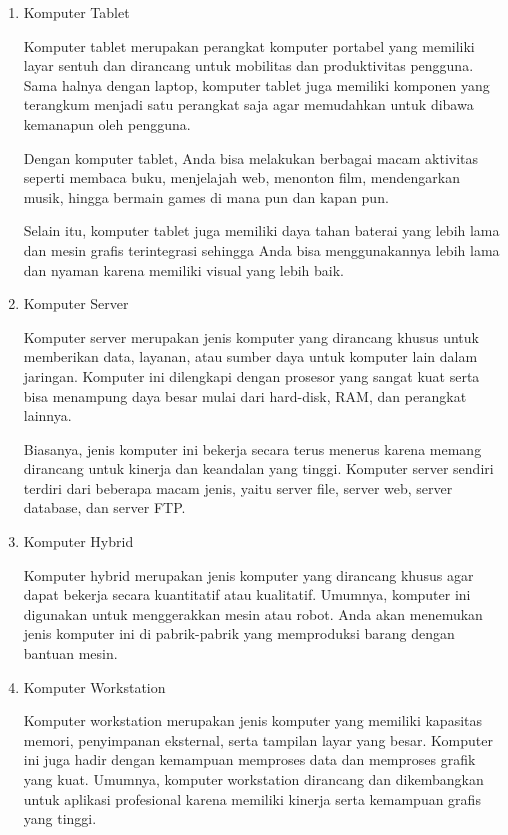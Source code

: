 \documentclass[12pt]{article}
\begin{document}
\begin{enumerate}
    \item  Komputer Tablet 

    Komputer tablet merupakan perangkat komputer portabel yang memiliki layar sentuh dan dirancang untuk mobilitas dan produktivitas pengguna. Sama halnya dengan laptop, komputer tablet juga memiliki komponen yang terangkum menjadi satu perangkat saja agar memudahkan untuk dibawa kemanapun oleh pengguna. 

    Dengan komputer tablet, Anda bisa melakukan berbagai macam aktivitas seperti membaca buku, menjelajah web, menonton film, mendengarkan musik, hingga bermain games di mana pun dan kapan pun. 

    Selain itu, komputer tablet juga memiliki daya tahan baterai yang lebih lama dan mesin grafis terintegrasi sehingga Anda bisa menggunakannya lebih lama dan nyaman karena memiliki visual yang lebih baik. 

    \item Komputer Server 

    Komputer server merupakan jenis komputer yang dirancang khusus untuk memberikan data, layanan, atau sumber daya untuk komputer lain dalam jaringan. Komputer ini dilengkapi dengan prosesor yang sangat kuat serta bisa menampung daya besar mulai dari hard-disk, RAM, dan perangkat lainnya. 

    Biasanya, jenis komputer ini bekerja secara terus menerus karena memang dirancang untuk kinerja dan keandalan yang tinggi. Komputer server sendiri terdiri dari beberapa macam jenis, yaitu server file, server web, server database, dan server FTP. 

    \item Komputer Hybrid 
    
    Komputer hybrid merupakan jenis komputer yang dirancang khusus agar dapat bekerja secara kuantitatif atau kualitatif. Umumnya, komputer ini digunakan untuk menggerakkan mesin atau robot. Anda akan menemukan jenis komputer ini di pabrik-pabrik yang memproduksi barang dengan bantuan mesin.

    \item Komputer Workstation

    Komputer workstation merupakan jenis komputer yang memiliki kapasitas memori, penyimpanan eksternal, serta tampilan layar yang besar. Komputer ini juga hadir dengan kemampuan memproses data dan memproses grafik yang kuat. Umumnya, komputer workstation dirancang dan dikembangkan untuk aplikasi profesional karena memiliki kinerja serta kemampuan grafis yang tinggi. 


\end{enumerate}
\end{document}
